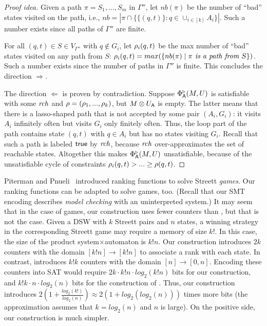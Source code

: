 \begin{proof}[Proof idea]
\- Given a path $\pi = S_1,...,S_m$ in $\Gamma''$,
   let $nb(\pi)$ be the number of ``bad'' states visited on the path,
   i.e., $nb = |\pi \cap \{ \{ (q,t) \} : q \in \cup_{i \in [k]} A_i \}|$.
   Such a number exists since all paths of $\Gamma''$ are finite.

\- For all $(q,t) \in S \in V_{\Gamma''}$ with $q \not\in G_i$,
   let $\rho_i(q,t)$ be the max number of ``bad'' states
   visited on any path from $S$:
   $\rho_i(q,t) = max(\{ nb(\pi) \mid \pi \textit{ is a path from $S$} \})$.
   Such a number exists since the number of paths in $\Gamma''$ is finite.
\il
This concludes the direction $\Rightarrow$.

The direction $\Leftarrow$ is proven by contradiction.
Suppose $\Phi^{\triangleright}_{\operatorname{\mathsf{A}}}(M,U)$ is satisfiable with some $\mathit{rch}$ and $\rho = (\rho_1,...,\rho_k)$,
but $M \otimes U_{\operatorname{\mathsf{A}}}$ is empty.
The latter means that there is a lasso-shaped path that is not accepted by some pair $(A_i,G_i)$:
it visits $A_i$ infinitely often but visits $G_i$ only finitely often.
Thus, the loop part of the path contains state $(q,t)$ with $q \in A_i$ but has no states visiting $G_i$.
Recall that such a path is labeled $\textsf{true}$ by $\mathit{rch}$,
because $\mathit{rch}$ over-approximates the set of reachable states.
Altogether this makes $\Phi^{\triangleright}_{\operatorname{\mathsf{A}}}(M,U)$ unsatisfiable,
because of the unsatisfiable cycle of constraints $\rho_i(q,t) > ... \geq \rho(q,t)$.
\end{proof}

\begin{remark}
Piterman and Pnueli~\cite{Nir06} introduced ranking functions
to solve Streett \emph{games}.
Our ranking functions can be adapted to solve games, too.
(Recall that our SMT encoding describes \emph{model checking}
 with an uninterpreted system.)
It may seem that in the case of games, our construction uses fewer counters
than \cite{Nir06}, but that is not the case.
Given a DSW with $k$ Streett pairs and $n$ states, a winning strategy in the corresponding Streett game
may require a memory of size $k!$.
In this case, the size of the product system$\times$automaton is $k!n$.
Our construction introduces $2k$ counters with the domain $[k!n] \to
[k!n]$ to associate a rank with each state.
In contrast, \cite{Nir06} introduces $k!k$ counters with the domain
$[n] \to [0,n]$.
Encoding these counters into SAT would require
$2k\cdot k!n \cdot log_2(k!n)$ bits for our construction, and
$k!k\cdot n\cdot log_2(n)$ bits for the construction of \cite{Nir06}.
Thus, our construction introduces $2(1\!+\!\frac{log_2(k!)}{log_2(n)}) \approx 2(1\!+\!log_2(log_2(n)))$ times more bits
(the approximation assumes that $k = log_2(n)$ and $n$ is large).
On the positive side, our construction is much simpler.
\end{remark}


